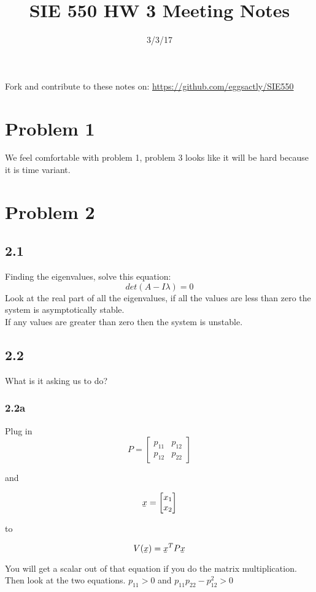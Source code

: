 \documentclass[12pt]{article}
\newcommand{\ubar}[1]{\underaccent{\bar}{#1}}
\begin{document}
\title{SIE 550 HW 3 Meeting Notes}
\date{3/3/17}

\maketitle

Fork and contribute to these notes on: \url{https://github.com/eggsactly/SIE550}

\section*{Problem 1} 
We feel comfortable with problem 1, problem 3 looks like it will be hard because it is time variant. 

\section*{Problem 2} 
\subsection*{2.1}
Finding the eigenvalues, solve this equation:
$$det(A-I\lambda)=0$$
Look at the real part of all the eigenvalues, if all the values are less than zero the system is asymptotically stable.\\
If any values are greater than zero then the system is unstable. 

\subsection*{2.2}
What is it asking us to do?

\subsubsection*{2.2a}
Plug in 
$$P=\begin{bmatrix} p_{11} & p_{12} \\
p_{12} & p_{22}
\end{bmatrix}$$ 

and 

$$\ubar{x}=\begin{bmatrix} x_{1} \\
x_{2}
\end{bmatrix}$$ 

to

$$V(\ubar{x})=\ubar{x}^TP\ubar{x}$$

You will get a scalar out of that equation if you do the matrix multiplication. Then look at the two equations. 
$p_{11}>0$ 
and
$p_{11}p_{22}-p_{12}^2>0$ \\
\end{document}
